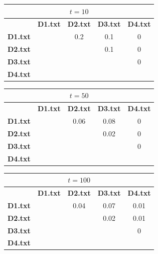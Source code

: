 \documentclass[11pt]{article}
\begin{document}
\begin{center}

\begin{tabular}{| c || c | c | c | c |}
\hline
\multicolumn{5}{|c|}{$t = 10$} \\
\hline
& \textbf{D1.txt} & \textbf{D2.txt}  & \textbf{D3.txt}  & \textbf{D4.txt} \\
\hline
\hline
\textbf{D1.txt} &  & 0.2 & 0.1 & 0 \\
\hline
\textbf{D2.txt} &  & & 0.1 & 0 \\
\hline
\textbf{D3.txt} &  &  &  & 0 \\
\hline
\textbf{D4.txt} &  &  &  &  \\
\hline
\end{tabular}

\end{center}


\begin{center}

\begin{tabular}{| c || c | c | c | c |}
\hline
\multicolumn{5}{|c|}{$t = 50$} \\
\hline
& \textbf{D1.txt} & \textbf{D2.txt}  & \textbf{D3.txt}  & \textbf{D4.txt} \\
\hline
\hline
\textbf{D1.txt} &  & 0.06 & 0.08 & 0 \\
\hline
\textbf{D2.txt} &  & & 0.02 & 0 \\
\hline
\textbf{D3.txt} &  &  &  & 0 \\
\hline
\textbf{D4.txt} &  &  &  &  \\
\hline
\end{tabular}

\end{center}


\begin{center}

\begin{tabular}{| c || c | c | c | c |}
\hline
\multicolumn{5}{|c|}{$t = 100$} \\
\hline
& \textbf{D1.txt} & \textbf{D2.txt}  & \textbf{D3.txt}  & \textbf{D4.txt} \\
\hline
\hline
\textbf{D1.txt} &  & 0.04 & 0.07 & 0.01 \\
\hline
\textbf{D2.txt} &  & & 0.02 & 0.01 \\
\hline
\textbf{D3.txt} &  &  &  & 0 \\
\hline
\textbf{D4.txt} &  &  &  &  \\
\hline
\end{tabular}

\end{center}
\end{document}
